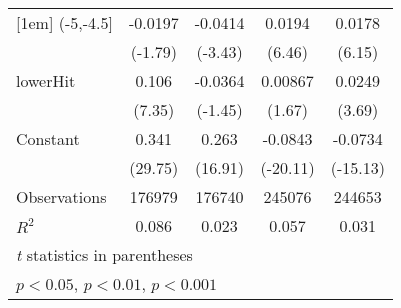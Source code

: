 {\begin{tabular}{l*{4}{c}}
[1em]
(-5,-4.5]           &     -0.0197         &     -0.0414\sym{***}&      0.0194\sym{***}&      0.0178\sym{***}\\
                    &     (-1.79)         &     (-3.43)         &      (6.46)         &      (6.15)         \\
[1em]
lowerHit            &       0.106\sym{***}&     -0.0364         &     0.00867         &      0.0249\sym{***}\\
                    &      (7.35)         &     (-1.45)         &      (1.67)         &      (3.69)         \\
[1em]
Constant            &       0.341\sym{***}&       0.263\sym{***}&     -0.0843\sym{***}&     -0.0734\sym{***}\\
                    &     (29.75)         &     (16.91)         &    (-20.11)         &    (-15.13)         \\
\hline
Observations        &      176979         &      176740         &      245076         &      244653         \\
\(R^{2}\)           &       0.086         &       0.023         &       0.057         &       0.031         \\
\hline\hline
\multicolumn{5}{l}{\footnotesize \textit{t} statistics in parentheses}\\
\multicolumn{5}{l}{\footnotesize \sym{*} \(p<0.05\), \sym{**} \(p<0.01\), \sym{***} \(p<0.001\)}\\
\end{tabular}
}
